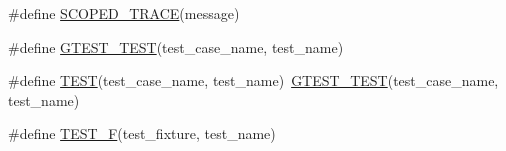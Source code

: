 \begin{DoxyCompactItemize}
\item 
\#define \mbox{\hyperlink{_obj__test_2lib_2googletest-release-1_88_81_2googletest_2include_2gtest_2gtest_8h_a4dac08f15adc8cb1ee0e5c1bfb0f440d}{S\+C\+O\+P\+E\+D\+\_\+\+T\+R\+A\+CE}}(message)
\item 
\#define \mbox{\hyperlink{_obj__test_2lib_2googletest-release-1_88_81_2googletest_2include_2gtest_2gtest_8h_a725b565bedc3a34dc109901854214cc4}{G\+T\+E\+S\+T\+\_\+\+T\+E\+ST}}(test\+\_\+case\+\_\+name,  test\+\_\+name)
\item 
\#define \mbox{\hyperlink{_obj__test_2lib_2googletest-release-1_88_81_2googletest_2include_2gtest_2gtest_8h_ad8b332753515c0ab8baada563c2547eb}{T\+E\+ST}}(test\+\_\+case\+\_\+name,  test\+\_\+name)~\mbox{\hyperlink{_obj__test_2lib_2googletest-release-1_88_81_2googletest_2test_2gtest__unittest_8cc_a54247aeadc0617105812dca8609638de}{G\+T\+E\+S\+T\+\_\+\+T\+E\+ST}}(test\+\_\+case\+\_\+name, test\+\_\+name)
\item 
\#define \mbox{\hyperlink{_obj__test_2lib_2googletest-release-1_88_81_2googletest_2include_2gtest_2gtest_8h_a0ee66d464d1a06c20c1929cae09d8758}{T\+E\+S\+T\+\_\+F}}(test\+\_\+fixture,  test\+\_\+name)
\end{DoxyCompactItemize}
